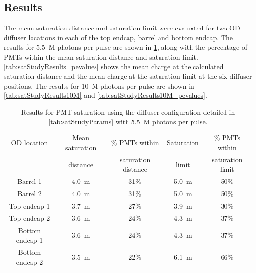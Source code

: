 \documentclass[a4paper,11pt]{article}
\begin{document}
\subsection{Results}\label{subsec:satResults}

The mean saturation distance and saturation limit were evaluated for two OD diffuser locations in each of the top endcap, barrel and bottom endcap. The results for 5.5~M photons per pulse are shown in \cref{tab:satStudyResults}, along with the percentage of PMTs within the mean saturation distance and saturation limit. \cref{tab:satStudyResults_pevalues} shows the mean charge at the calculated saturation distance and the mean charge at the saturation limit at the six diffuser positions. The results for 10~M photons per pulse are shown in \cref{tab:satStudyResults10M} and \cref{tab:satStudyResults10M_pevalues}.
\begin{table}[ht!]
    \centering
    \begin{tabular}{|c|c|c|c|c|}
    \hline
        OD location & Mean saturation & \% PMTs within & Saturation  & \% PMTs within \\
                    &  distance & saturation distance & limit &  saturation limit\\
        \hline
        Barrel 1        & 4.0~m & 31\%        & 5.0~m   & 50\% \\
        Barrel 2        & 4.0~m    & 31\%     & 5.0~m   & 50\% \\
		Top endcap 1    & 3.7~m  & 27\%       & 3.9~m & 30\% \\
        Top endcap 2    & 3.6~m  & 24\%       & 4.3~m & 37\% \\ 
		Bottom endcap 1 & 3.6~m  & 24\%       & 4.3~m & 37\% \\
		Bottom endcap 2 & 3.5~m  & 22\%       & 6.1~m & 66\% \\
        \hline
    \end{tabular}
    \caption{Results for PMT saturation using the diffuser configuration detailed in \cref{tab:satStudyParams} with 5.5~M photons per pulse.}
    \label{tab:satStudyResults}
\end{table}
%
\end{document}
